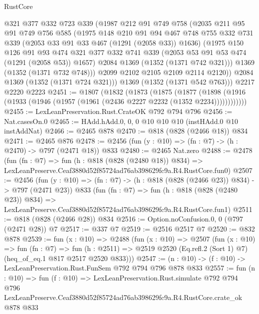 \begin{lexlean}{RustCore}
\begin{coremodule}
        @321
        @377
        @332
        @723
        @339
        (@1987
          @212
          @91
          @749
          @758
          (@2035
            @211
            @95
            @91
            @749
            @756
            @585
            (@1975
              @148
              @210
              @91
              @94
              @467
              @748
              @755
              @332
              @731
              @339
              (@2053 @33 @91 @33 @467 (@1291 (@2058 @33)) @1636)
              (@1975
                @150
                @126
                @91
                @93
                @474
                @321
                @377
                @332
                @741
                @339
                (@2053 @53 @91 @53 @474 (@1291 (@2058 @53)) @1657)
                @2084
                @1369
                (@1352 (@1371 @742 @321)))
              @1369
              (@1352 (@1371 @732 @748)))
            @2099
            @2102
            @2105
            @2109
            @2114
            @2120))
        @2084
        @1369
        (@1352 (@1371 @724 @321)))
      @1369
      (@1352 (@1371 @542 @763)))
    @2217
    @2220
    @2223
@2451 := @1807
    (@1832
      (@1873
        (@1875
          (@1877
            (@1898 (@1916 (@1933 (@1946 (@1957 (@1961 (@2436 @2227 @2232 (@1352 @2234))))))))))))
@2455 := LexLeanPreservation.Rust.CrateOK @792 @794 @796
@2456 := Nat.casesOn.{0}
@2465 := HAdd.hAdd.{0, 0, 0} @10 @10 @10 (instHAdd.{0} @10 instAddNat)
@2466 := @2465 @878
@2470 := @818 (@828 (@2466 @18)) @834
@2471 := @2465 @876
@2478 := @2456 (fun (y : @10) => (fn : @7) -> (h : @2470) -> @797 (@2471 @18)) @833
@2480 := @2465 Nat.zero
@2488 := @2478
    (fun (fn : @7) =>
    fun (h : @818 (@828 (@2480 @18)) @834) =>
    LexLeanPreserve.Ceaf3880d52f85724ad76ab398629fc9a.R4.RustCore.fun0)
@2507 := @2456
    (fun (y : @10) => (fn : @7) -> (h : @818 (@828 (@2466 @23)) @834) -> @797 (@2471 @23))
    @833
    (fun (fn : @7) =>
    fun (h : @818 (@828 (@2480 @23)) @834) =>
    LexLeanPreserve.Ceaf3880d52f85724ad76ab398629fc9a.R4.RustCore.fun1)
@2511 := @818 (@828 (@2466 @28)) @834
@2516 := Option.noConfusion.{0, 0} (@797 (@2471 @28)) @7
@2517 := @337 @7
@2519 := @2516 @2517 @7
@2520 := @832 @878
@2539 := fun (x : @10) =>
  @2488
    (fun (x : @10) =>
    @2507
      (fun (x : @10) =>
      fun (fn : @7) =>
      fun (h : @2511) =>
      @2519 @2520 (Eq.refl.{2} (Sort 1) @7) (heq_of_eq.{1} @817 @2517 @2520 @833)))
@2547 := (n : @10) -> (f : @10) -> LexLeanPreservation.Rust.FunSem @792 @794 @796 @878 @833
@2557 := fun (n : @10) =>
  fun (f : @10) =>
  LexLeanPreservation.Rust.simulate
    @792
    @794
    @796
    LexLeanPreserve.Ceaf3880d52f85724ad76ab398629fc9a.R4.RustCore.crate_ok
    @878
    @833
\end{coremodule}
\end{lexlean}
